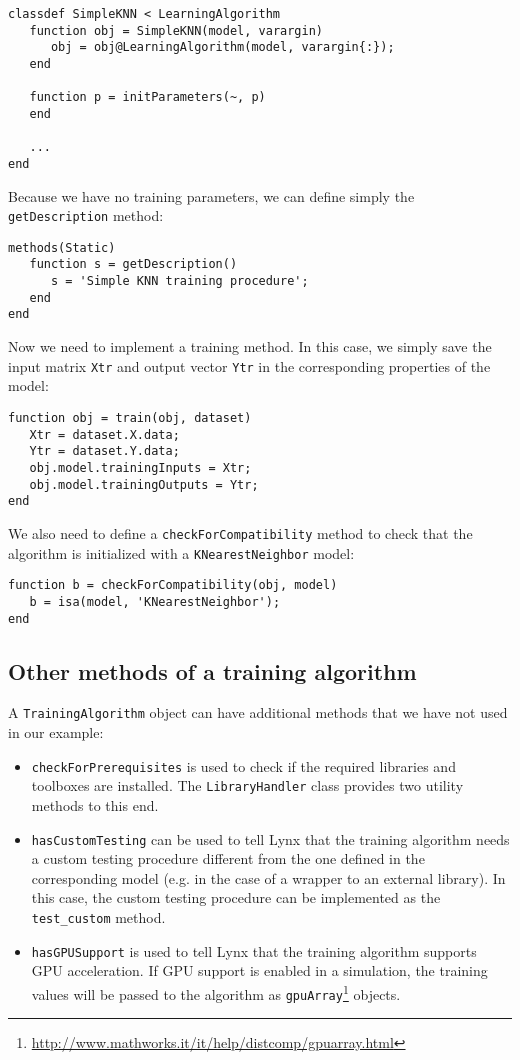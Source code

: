 \begin{lstlisting}
classdef SimpleKNN < LearningAlgorithm
   function obj = SimpleKNN(model, varargin)
      obj = obj@LearningAlgorithm(model, varargin{:});
   end
        
   function p = initParameters(~, p)
   end
   
   ...
end
\end{lstlisting}

\noindent Because we have no training parameters, we can define simply the \verb|getDescription| method:

\begin{lstlisting}
methods(Static)
   function s = getDescription()
      s = 'Simple KNN training procedure';
   end
end
\end{lstlisting}

\noindent Now we need to implement a training method. In this case, we simply save the input matrix \verb|Xtr| and output vector \verb|Ytr| in the corresponding properties of the model:

\begin{lstlisting}
function obj = train(obj, dataset)
   Xtr = dataset.X.data;
   Ytr = dataset.Y.data;
   obj.model.trainingInputs = Xtr;
   obj.model.trainingOutputs = Ytr;                    
end
\end{lstlisting}

\noindent We also need to define a \verb|checkForCompatibility| method to check that the algorithm is initialized with a \verb|KNearestNeighbor| model:

\begin{lstlisting}
function b = checkForCompatibility(obj, model)
   b = isa(model, 'KNearestNeighbor');
end
\end{lstlisting}

\subsection{Other methods of a training algorithm}

A \verb|TrainingAlgorithm| object can have additional methods that we have not used in our example:

\begin{itemize}
\item \verb|checkForPrerequisites| is used to check if the required libraries and toolboxes are installed. The \verb|LibraryHandler| class provides two utility methods to this end.
\item \verb|hasCustomTesting| can be used to tell Lynx that the training algorithm needs a custom testing procedure different from the one defined in the corresponding model (e.g. in the case of a wrapper to an external library). In this case, the custom testing procedure can be implemented as the \verb|test_custom| method.
\item \verb|hasGPUSupport| is used to tell Lynx that the training algorithm supports GPU acceleration. If GPU support is enabled in a simulation, the training values will be passed to the algorithm as \verb|gpuArray|\footnote{\url{http://www.mathworks.it/it/help/distcomp/gpuarray.html}} objects.
\end{itemize}

